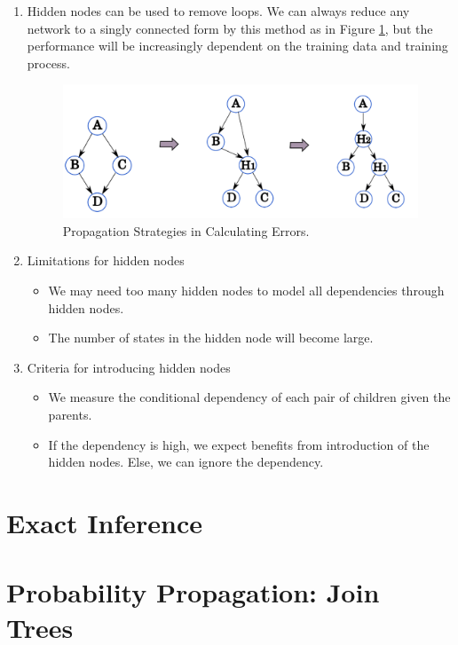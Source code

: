 \documentclass[12pt,twoside]{article}
\begin{document}
\begin{enumerate}
\begin{enumerate}
	\end{enumerate}


\item  Hidden nodes can be used to remove loops. We can always reduce any network to a singly connected form by this method as in Figure \ref{fig:ReduceLoops}, but the performance will be increasingly dependent on the training data and training process. 

\begin{figure}[H]		
	\begin{center}
		\includegraphics[width = 0.5\hsize]{./figures/ReducingLoopsFinal.png} 
			\caption{Propagation Strategies in Calculating Errors.}
		\label{fig:ReduceLoops} %
	\end{center}
\end{figure}	

\item Limitations for hidden nodes
	\begin{itemize}
		\item We may need too many hidden nodes to model all dependencies through hidden nodes.
		\item The number of states in the hidden node will become large.
	\end{itemize}

\item Criteria for introducing hidden nodes
	\begin{itemize}
		\item We measure the conditional dependency of each pair of children given the parents. 
		\item If the dependency is high, we expect benefits from introduction of the hidden nodes. Else, we can ignore the dependency.
	\end{itemize}

\end{enumerate}







\section{Exact Inference}

\section{Probability Propagation: Join Trees}
\end{document}
